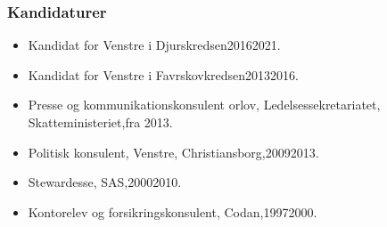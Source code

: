 \documentclass[11pt, a4paper]{awesome-cv}
\begin{document}
\begin{cvletter}
\subsubsection*{Kandidaturer}
\begin{itemize}
\item Kandidat for Venstre i Djurskredsen20162021.
\item Kandidat for Venstre i Favrskovkredsen20132016.
\end{itemize}
\begin{itemize}
\item Presse og kommunikationskonsulent orlov, Ledelsessekretariatet, Skatteministeriet,fra 2013.
\item Politisk konsulent, Venstre, Christiansborg,20092013.
\item Stewardesse, SAS,20002010.
\item Kontorelev og forsikringskonsulent, Codan,19972000.
\end{itemize}
\end{cvletter}
\end{document}
